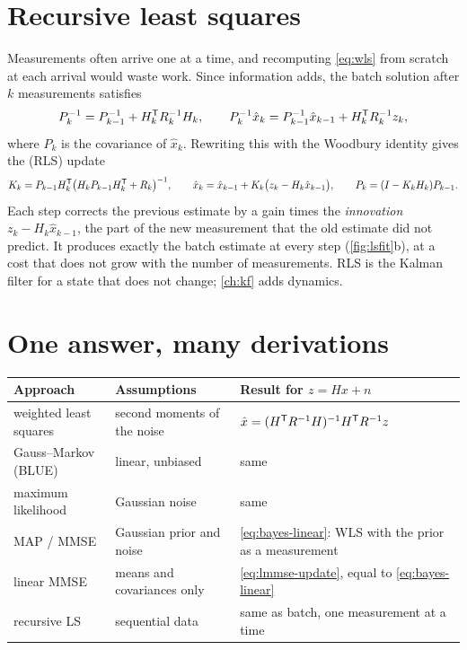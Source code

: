 \section{Recursive least squares}

Measurements often arrive one at a time, and recomputing \eqref{eq:wls} from scratch at each arrival would waste work. Since information adds,
the batch solution after $k$ measurements satisfies
\begin{equation}
  P_k^{-1} = P_{k-1}^{-1} + H_k^{\mathsf{T}} R_k^{-1} H_k, \qquad P_k^{-1}\hat x_k = P_{k-1}^{-1}\hat x_{k-1} + H_k^{\mathsf{T}} R_k^{-1} z_k,
\end{equation}
where $P_k$ is the covariance of $\hat x_k$. Rewriting this with the Woodbury identity gives the  (RLS) update
\begin{equation}
  K_k = P_{k-1}H_k^{\mathsf{T}}\big(H_kP_{k-1}H_k^{\mathsf{T}} + R_k\big)^{-1}, \qquad
  \hat x_k = \hat x_{k-1} + K_k\big(z_k - H_k\hat x_{k-1}\big), \qquad
  P_k = (I - K_kH_k)P_{k-1} .
\end{equation}
Each step corrects the previous estimate by a gain times the \emph{innovation} $z_k - H_k\hat x_{k-1}$, the part of the new measurement that the old
estimate did not predict. It produces exactly the batch estimate at every step (\cref{fig:lsfit}b), at a cost that does not grow with the number
of measurements. RLS is the Kalman filter for a state that does not change; \cref{ch:kf} adds dynamics.

\section{One answer, many derivations}

\begin{center}\small
\begin{tabularx}{\textwidth}{@{}l l >{\raggedright\arraybackslash}X@{}}
\toprule
Approach & Assumptions & Result for $z = Hx + n$ \\
\midrule
weighted least squares & second moments of the noise & $\hat x = (H^{\mathsf{T}} R^{-1} H)^{-1} H^{\mathsf{T}} R^{-1} z$ \\
Gauss--Markov (BLUE) & linear, unbiased & same \\
maximum likelihood & Gaussian noise & same \\
MAP / MMSE & Gaussian prior and noise & \eqref{eq:bayes-linear}: WLS with the prior as a measurement \\
linear MMSE & means and covariances only & \eqref{eq:lmmse-update}, equal to \eqref{eq:bayes-linear} \\
recursive LS & sequential data & same as batch, one measurement at a time \\
\bottomrule
\end{tabularx}
\end{center}


